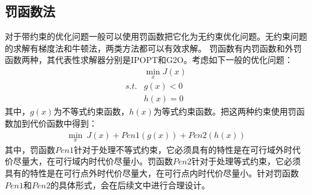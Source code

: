 \documentclass[master,academic]{ysuthesis} %
\begin{document}
		\subsection{罚函数法}
		对于带约束的优化问题一般可以使用罚函数把它化为无约束优化问题。无约束问题的求解有梯度法和牛顿法，两类方法都可以有效求解。
		罚函数有内罚函数和外罚函数两种，其代表性求解器分别是IPOPT和G2O。考虑如下一般的优化问题：
		\begin{equation}
			\begin{aligned}
				&\min_{x} J(x)\\
					s.t. &g(x)<0\\
					&h(x)=0
			\end{aligned}
			\label{优化问题}
		\end{equation}
		其中，$g(x)$为不等式约束函数，$h(x)$为等式约束函数。把这两种约束使用罚函数加到代价函数中得到：
		\begin{equation}
			\begin{aligned}
				\min_{x} \ J(x)+Pen1(g(x))+Pen2(h(x))
			\end{aligned}
		\end{equation}
		其中，罚函数$Pen1$针对于处理不等式约束，它必须具有的特性是在可行域外时代价尽量大，在可行域内时代价尽量小。罚函数$Pen2$针对于处理等式约束，它必须具有的特性是在可行点外时代价尽量大，在可行点内时代价尽量小。针对罚函数$Pen1$和$Pen2$的具体形式，会在后续文中进行合理设计。
\end{document}
